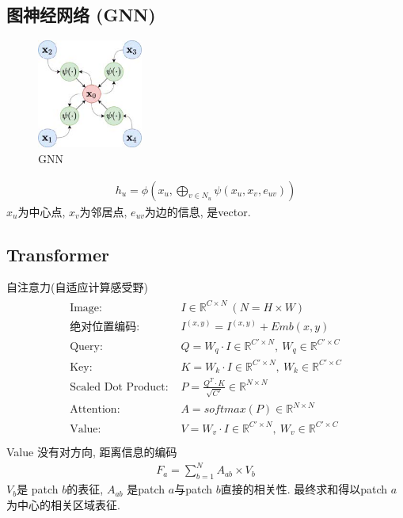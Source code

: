 \subsection{图神经网络 (GNN)}
\begin{figure}[!htb]
    \centering
    \includegraphics[width=0.309\textwidth]{pic/DL2/GNN}
    \caption{GNN}
\end{figure}


\begin{align*}
    h_u=\phi\left( x_u, \bigoplus_{v\in N_u}\psi(x_u, x_v, e_{uv}) \right)
\end{align*}
$x_u$为中心点, $x_v$为邻居点, $e_{uv}$为边的信息, 是vector. 

\subsection{Transformer}
自注意力(自适应计算感受野)
{\small
\begin{align*}
    \begin{array}{rl}
        \text{Image: }& I \in \mathbb{R}^{C\times N}\ (N=H\times W)\\
        \text{绝对位置编码: }& I^{(x,y)}=I^{(x,y)}+Emb(x,y)\\ 
        \text{Query: }& Q=W_q\cdot I \in \mathbb{R}^{C'\times N},\ W_q\in \mathbb{R}^{C'\times C}\\
        \text{Key: }& K=W_k\cdot I \in \mathbb{R}^{C'\times N},\ W_k\in \mathbb{R}^{C'\times C}\\
        \text{Scaled Dot Product: }& P=\frac{Q^T\cdot K}{\sqrt{C'}}\in \mathbb{R}^{N\times N}\\
        \text{Attention: }& A=softmax(P)\in \mathbb{R}^{N\times N}\\
        \text{Value: }& V=W_v\cdot I \in \mathbb{R}^{C' \times N},\ W_v\in \mathbb{R}^{C'\times C}\\
    \end{array}
\end{align*}
}Value 没有对方向, 距离信息的编码
\begin{align*}
    F_a=\sum_{b=1}^N A_{ab}\times V_b
\end{align*}
$V_b$是 patch $b$的表征, $A_{ab}$ 是patch $a$与patch $b$直接的相关性. 最终求和得以patch $a$为中心的相关区域表征. 

